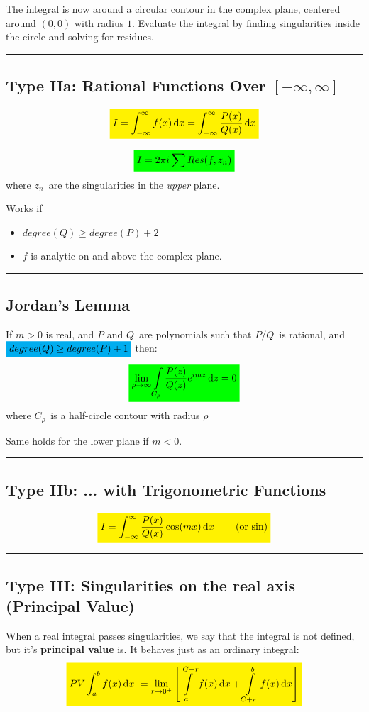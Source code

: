 \documentclass[10pt,a4paper]{article}
\renewcommand{\exp}{e^}
\newcommand{\holine}{\rule{286pt}{1pt}}
\newcommand{\yl}[1]{\colorbox{yellow}{$\displaystyle #1$}}
\newcommand{\gr}[1]{\colorbox{green}{$\displaystyle #1$}}
\newcommand{\bl}[1]{\colorbox{cyan}{$\displaystyle #1$}}
\begin{document}
\begin{multicols}{2}
The integral is now around a circular contour in the complex plane, centered around $(0,0)$ with radius $1$. Evaluate the integral by finding singularities inside the circle and solving for residues.




\holine
\subsection*{Type IIa: Rational Functions Over $[-\infty, \infty]$}
\[\yl{
    I = \int_{-\infty}^\infty f(x) \dd{x} = \int_{-\infty}^\infty \dfrac{P(x)}{Q(x)} \dd{x}
}\]

\[\gr{
    I = 2\pi i \sum Res(f, z_n)
}\]
where $z_n$ are the singularities in the \textit{upper} plane.

Works if
\begin{itemize}
    \item $degree(Q) \geq degree(P) + 2$
    \item $f$ is analytic on and above the complex plane.
\end{itemize}



\holine
\subsection*{Jordan's Lemma}
If $m>0$ is real, and $P$ and $Q$ are polynomials such that $P/Q$ is rational, and $\bl{degree(Q) \geq degree(P) + 1}$ then:
\[\gr{
    \lim\limits_{\rho\rightarrow\infty}\int\limits_{C_\rho} \frac{P(z)}{Q(z)}\exp{imz} \dd{z} = 0
}\]
where $C_\rho$ is a half-circle contour with radius $\rho$

Same holds for the lower plane if $m<0$.


\holine
\subsection*{Type IIb: ... with Trigonometric Functions}
\[\yl{
    I = \int_{-\infty}^\infty \dfrac{P(x)}{Q(x)}\cos(m x) \dd{x} \quad\quad \text{(or sin)}
}\]



\holine
\subsection*{Type III: Singularities on the real axis (Principal Value)}
When a real integral passes singularities, we say that the integral is not defined, but it's \textbf{principal value} is. It behaves just as an ordinary integral:
\[
\yl{
    PV\int_a^b f(x) \dd{x} = \lim\limits_{r\rightarrow 0^+} \qty[\int\limits_a^{C-r} f(x) \dd{x} + \int\limits_{C+r}^b f(x) \dd{x} ]
}
\]


\end{multicols}
\end{document}
